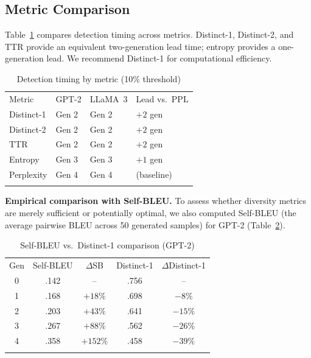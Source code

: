 \documentclass{svproc}
\newcommand{\dist}[1]{Distinct-#1}
\begin{document}
\subsection{Metric Comparison}\label{sec:metric-comp}
Table~\ref{tab:timing} compares detection timing across metrics. \dist{1},
\dist{2}, and TTR provide an equivalent two-generation lead time; entropy provides
a one-generation lead. We recommend \dist{1} for computational efficiency.

\begin{table}[t]
\centering
\caption{Detection timing by metric (10\% threshold)}
\label{tab:timing}
\begin{tabular}{llll}
\hline\noalign{\smallskip}
Metric & GPT-2 & LLaMA~3 & Lead vs.\ PPL \\
\noalign{\smallskip}\hline\noalign{\smallskip}
\dist{1}   & Gen 2 & Gen 2 & $+2$ gen   \\
\dist{2}   & Gen 2 & Gen 2 & $+2$ gen   \\
TTR        & Gen 2 & Gen 2 & $+2$ gen   \\
Entropy    & Gen 3 & Gen 3 & $+1$ gen   \\
Perplexity & Gen 4 & Gen 4 & (baseline) \\
\noalign{\smallskip}\hline
\end{tabular}
\end{table}

\noindent\textbf{Empirical comparison with Self-BLEU.} To assess whether diversity
metrics are merely sufficient or potentially optimal, we also computed Self-BLEU
(the average pairwise BLEU across 50 generated samples) for GPT-2
(Table~\ref{tab:selfbleu}).

\begin{table}[t]
\centering
\caption{Self-BLEU vs.\ \dist{1} comparison (GPT-2)}
\label{tab:selfbleu}
\begin{tabular}{ccccc}
\hline\noalign{\smallskip}
Gen & Self-BLEU & $\Delta$SB & \dist{1} & $\Delta$\dist{1} \\
\noalign{\smallskip}\hline\noalign{\smallskip}
0 & .142 & --      & .756 & --      \\
1 & .168 & $+18\%$ & .698 & $-8\%$  \\
2 & .203 & $+43\%$ & .641 & $-15\%$ \\
3 & .267 & $+88\%$ & .562 & $-26\%$ \\
4 & .358 & $+152\%$& .458 & $-39\%$ \\
\noalign{\smallskip}\hline
\end{tabular}
\end{table}
\end{document}
